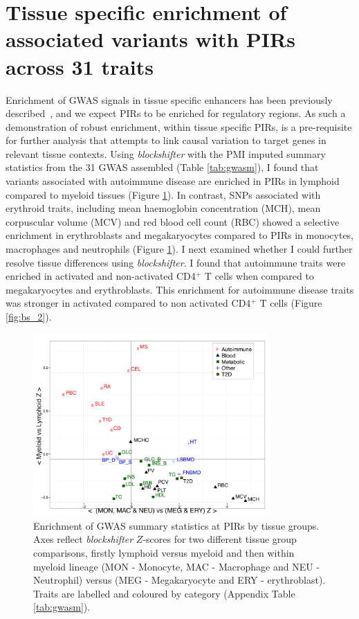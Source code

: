 \documentclass[a4paper,11pt]{report}
\begin{document}
\section{Tissue specific enrichment of associated variants with PIRs across 31 traits}
Enrichment of GWAS signals in tissue specific enhancers has been previously described~\citep{MauranoHumbertRynesEtAl2012}, and we expect PIRs to be enriched for regulatory regions. As such a demonstration of robust enrichment, within tissue specific PIRs, is a pre-requisite for further analysis that attempts to link causal variation to target genes in relevant tissue contexts.  Using \textit{blockshifter} with the PMI imputed summary statistics from the 31 GWAS assembled (Table \ref{tab:gwasm}), I found that variants associated with autoimmune disease are enriched in PIRs in lymphoid compared to myeloid tissues (Figure \ref{fig:bs_1}). In contrast, SNPs associated with erythroid traits, including mean haemoglobin concentration (MCH), mean corpuscular volume (MCV) and red blood cell count (RBC) showed a selective enrichment in erythroblasts and megakaryocytes compared to PIRs in monocytes, macrophages and neutrophils (Figure \ref{fig:bs_1}). I next examined whether I could further resolve tissue differences using \textit{blockshifter}. I found that autoimmune traits were enriched in activated and non-activated CD4$^{+}$ T cells when compared to megakaryocytes and erythroblasts. This enrichment for autoimmune disease traits was stronger in activated  compared to non activated CD4$^{+}$ T cells (Figure \ref{fig:bs_2}).


\begin{figure}[h]
\centering
\includegraphics[width=0.8\textwidth]{block_shifter_scatter.pdf}
\caption{Enrichment of GWAS summary statistics at PIRs by tissue groups. Axes reflect \textit{blockshifter} $Z$-scores for two different tissue group comparisons, firstly lymphoid versus myeloid and then within myeloid lineage (MON - Monocyte, MAC - Macrophage and NEU - Neutrophil) versus (MEG - Megakaryocyte and ERY - erythroblast). Traits are labelled and coloured by category (Appendix Table \ref{tab:gwasm}).}
\label{fig:bs_1}
\end{figure}
\end{document}
